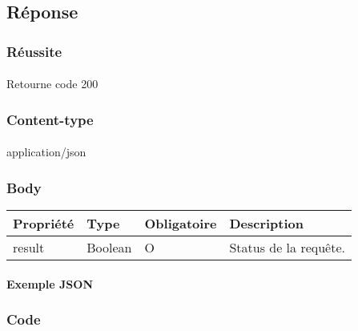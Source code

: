 			\paragraph{}
			

\subsection{Réponse}
	\subsubsection{Réussite}
		\paragraph{}
			Retourne code 200
			
	\subsubsection{Content-type}
		\paragraph{}
			application/json
	
	\subsubsection{Body}
		\begin{center}
			\begin{tabularx}{\textwidth}{| T{0.2122\textwidth} | S{0.22\textwidth} | S{0.15\textwidth} | S{0.3\textwidth} |}
				\hline
				Propriété & Type & Obligatoire & Description \\
				\hline
				result & Boolean & O & Status de la requête. \\
				\hline
			\end{tabularx}
		\end{center}
		
		\newpage
		\paragraph{Exemple JSON}
			\paragraph{}
			
			
			
	\subsubsection{Code}
		\paragraph{}

